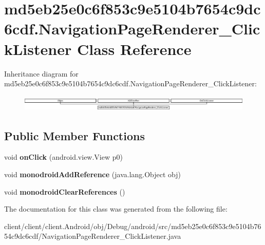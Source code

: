 \hypertarget{classmd5eb25e0c6f853c9e5104b7654c9dc6cdf_1_1NavigationPageRenderer__ClickListener}{}\section{md5eb25e0c6f853c9e5104b7654c9dc6cdf.\+Navigation\+Page\+Renderer\+\_\+\+Click\+Listener Class Reference}
\label{classmd5eb25e0c6f853c9e5104b7654c9dc6cdf_1_1NavigationPageRenderer__ClickListener}
Inheritance diagram for md5eb25e0c6f853c9e5104b7654c9dc6cdf.\+Navigation\+Page\+Renderer\+\_\+\+Click\+Listener\+:\begin{figure}[H]
\begin{center}
\leavevmode
\includegraphics[height=0.766598cm]{classmd5eb25e0c6f853c9e5104b7654c9dc6cdf_1_1NavigationPageRenderer__ClickListener}
\end{center}
\end{figure}
\subsection*{Public Member Functions}
\begin{DoxyCompactItemize}
\item 
\hypertarget{classmd5eb25e0c6f853c9e5104b7654c9dc6cdf_1_1NavigationPageRenderer__ClickListener_a180754fa0d95ed0910d3818b914f14f2}{}void {\bfseries on\+Click} (android.\+view.\+View p0)\label{classmd5eb25e0c6f853c9e5104b7654c9dc6cdf_1_1NavigationPageRenderer__ClickListener_a180754fa0d95ed0910d3818b914f14f2}

\item 
\hypertarget{classmd5eb25e0c6f853c9e5104b7654c9dc6cdf_1_1NavigationPageRenderer__ClickListener_ad7275fb977f1aa078601cbfb47a0d4af}{}void {\bfseries monodroid\+Add\+Reference} (java.\+lang.\+Object obj)\label{classmd5eb25e0c6f853c9e5104b7654c9dc6cdf_1_1NavigationPageRenderer__ClickListener_ad7275fb977f1aa078601cbfb47a0d4af}

\item 
\hypertarget{classmd5eb25e0c6f853c9e5104b7654c9dc6cdf_1_1NavigationPageRenderer__ClickListener_aa2a80e6649b65e76c8161323236022fd}{}void {\bfseries monodroid\+Clear\+References} ()\label{classmd5eb25e0c6f853c9e5104b7654c9dc6cdf_1_1NavigationPageRenderer__ClickListener_aa2a80e6649b65e76c8161323236022fd}

\end{DoxyCompactItemize}


The documentation for this class was generated from the following file\+:\begin{DoxyCompactItemize}
\item 
client/client/client.\+Android/obj/\+Debug/android/src/md5eb25e0c6f853c9e5104b7654c9dc6cdf/Navigation\+Page\+Renderer\+\_\+\+Click\+Listener.\+java\end{DoxyCompactItemize}
